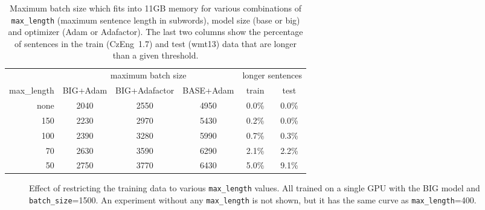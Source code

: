 \documentclass{pbmlarxiv} \pdfoutput=1
\begin{document}
\begin{table}\centering
\begin{tabular}{r|ccc|cc}\hline
            &  \multicolumn{3}{c}{maximum batch size} & \multicolumn{2}{|c}{longer sentences}\\
max\_length & BIG+Adam & BIG+Adafactor & BASE+Adam & train & test\\\hline
none        & 2040     & 2550          & 4950      & 0.0\% & 0.0\% \\
150         & 2230     & 2970          & 5430      & 0.2\% & 0.0\% \\
100         & 2390     & 3280          & 5990      & 0.7\% & 0.3\% \\
70          & 2630     & 3590          & 6290      & 2.1\% & 2.2\% \\
50          & 2750     & 3770          & 6430      & 5.0\% & 9.1\% \\\hline
\end{tabular}
\caption{Maximum batch size which fits into 11GB memory for various combinations of
 \texttt{max\_length} (maximum sentence length in subwords),
 model size (base or big)
 and optimizer (Adam or Adafactor).
 The last two columns show the percentage of sentences in the train (CzEng~1.7) and test (wmt13) data
  that are longer than a given threshold.
}
\label{batch-sizes-for-sent-length}
\end{table}

\begin{figure}
\vspace{-5mm}
\cprotect\caption{Effect of restricting the training data to various \verb|max_length| values.
 All trained on a single GPU with the BIG model and \verb|batch_size|=1500.
 An experiment without any \verb|max_length| is not shown,
  but it has the same curve as \verb|max_length|=400.
}
\label{fig:max-length1500}
\end{figure}
\end{document}
